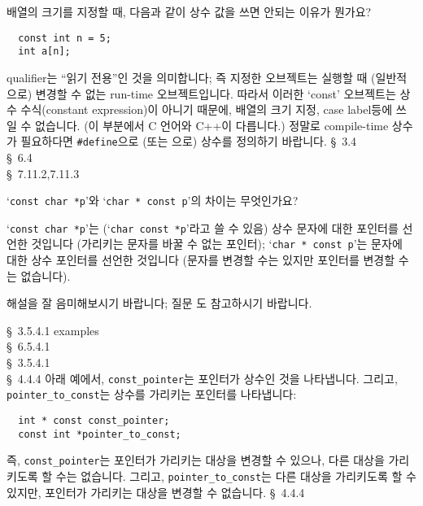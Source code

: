 \begin{faq}
	배열의 크기를 지정할 때, 다음과 같이 상수 값을 쓰면 안되는
	이유가 뭔가요?
\begin{verbatim}
  const int n = 5;
  int a[n];
\end{verbatim}
\A
	 qualifier는 ``읽기 전용''인 것을 의미합니다;
	즉 지정한 오브젝트는 실행할 때 (일반적으로) 변경할 수 없는
        run-time 오브젝트입니다.
	따라서 이러한 `const' 오브젝트는 상수 수식(constant expression)이
	아니기 때문에, 배열의 크기 지정, case label등에 쓰일 수 없습니다.
        (이 부분에서 C 언어와 C++이 다릅니다.)
	정말로 compile-time 상수가 필요하다면 \verb+#define+으로 (또는
	으로) 상수를 정의하기 바랍니다.
\R
	\cite{ansi} \S\ 3.4 \\
	\cite{c89} \S\ 6.4 \\
	\cite{hs} \S\ 7.11.2,7.11.3 
\end{faq}

\begin{faq}
	`\verb+const char *p+'와 `\verb+char * const p+'의 차이는
	무엇인가요?

\A
	`\verb+const char *p+'는 (`\verb+char const *p+'라고 쓸 수 있음)
	상수 문자에 대한 포인터를 선언한 것입니다 (가리키는 문자를 바꿀 수
        없는 포인터);
	`\verb+char * const p+'는 문자에 대한 상수 포인터를 선언한 것입니다
	(문자를 변경할 수는 있지만 포인터를 변경할 수는 없습니다).

	해설을 잘 음미해보시기 바랍니다; 질문 도 참고하시기 바랍니다.

\R
	\cite{ansi} \S\ 3.5.4.1 examples \\
	\cite{c89} \S\ 6.5.4.1 \\
	\cite{rationale} \S\ 3.5.4.1 \\
	\cite{hs} \S\ 4.4.4 
\T
	아래 예에서, \verb+const_pointer+는 포인터가 상수인 것을 
        나타냅니다. 그리고, 
        \verb+pointer_to_const+는 상수를 가리키는 포인터를 나타냅니다:
\begin{verbatim}
  int * const const_pointer;
  const int *pointer_to_const;
\end{verbatim}
	\noindent 즉, \verb+const_pointer+는 포인터가 가리키는 대상을
        변경할 수 있으나, 다른 대상을 가리키도록 할 수는 없습니다. 그리고,
        \verb+pointer_to_const+는 다른 대상을 가리키도록 할 수 있지만,
        포인터가 가리키는 대상을 변경할 수 없습니다.
\R
	\cite{hs5} \S\ 4.4.4 
\end{faq}

